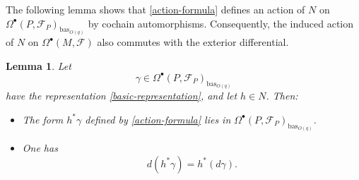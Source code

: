 \documentclass[reqno, 11pt]{amsart}
\newtheorem{lem}[thm]{Lemma}
\theoremstyle{definition}
\theoremstyle{property}
\theoremstyle{remark}
\numberwithin{equation}{section}
\begin{document}
The following lemma shows that \eqref{action-formula} defines an action of
$N$ on $\Omega^\bullet(P,\mathcal{F}_P)_{\mathrm{bas}_{O(q)}}$ by cochain
automorphisms. Consequently, the induced action of $N$ on
$\Omega^\bullet(M,\mathcal{F})$ also commutes with the exterior differential.


\begin{lem}\label{action-property}
Let
\[
\gamma\in \Omega^\bullet(P,\mathcal{F}_P)_{\mathrm{bas}_{O(q)}}
\]
have the representation \eqref{basic-representation}, and let $h\in N$. Then:
\begin{itemize}
\item[(a)] The form $h^*\gamma$ defined by \eqref{action-formula} lies in
$\Omega^\bullet(P,\mathcal{F}_P)_{\mathrm{bas}_{O(q)}}$.
\item[(b)] One has
\[
d(h^*\gamma)=h^*(d\gamma).
\]
\end{itemize}
\end{lem}
\end{document}
